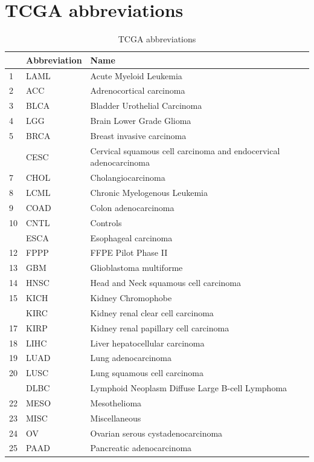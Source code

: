 \documentclass[
]{book}
\begin{document}
\section{TCGA abbreviations}\label{tcga-abbreviations}

\begin{table}

\caption{\label{tab:tb04-1}TCGA abbreviations}
\centering
\begin{tabular}[t]{lll}
\toprule
 & Abbreviation & Name\\
\midrule
1 & LAML & Acute Myeloid Leukemia\\
2 & ACC & Adrenocortical carcinoma\\
3 & BLCA & Bladder Urothelial Carcinoma\\
4 & LGG & Brain Lower Grade Glioma\\
5 & BRCA & Breast invasive carcinoma\\
\addlinespace
6 & CESC & Cervical squamous cell carcinoma and endocervical adenocarcinoma\\
7 & CHOL & Cholangiocarcinoma\\
8 & LCML & Chronic Myelogenous Leukemia\\
9 & COAD & Colon adenocarcinoma\\
10 & CNTL & Controls\\
\addlinespace
11 & ESCA & Esophageal carcinoma\\
12 & FPPP & FFPE Pilot Phase II\\
13 & GBM & Glioblastoma multiforme\\
14 & HNSC & Head and Neck squamous cell carcinoma\\
15 & KICH & Kidney Chromophobe\\
\addlinespace
16 & KIRC & Kidney renal clear cell carcinoma\\
17 & KIRP & Kidney renal papillary cell carcinoma\\
18 & LIHC & Liver hepatocellular carcinoma\\
19 & LUAD & Lung adenocarcinoma\\
20 & LUSC & Lung squamous cell carcinoma\\
\addlinespace
21 & DLBC & Lymphoid Neoplasm Diffuse Large B-cell Lymphoma\\
22 & MESO & Mesothelioma\\
23 & MISC & Miscellaneous\\
24 & OV & Ovarian serous cystadenocarcinoma\\
25 & PAAD & Pancreatic adenocarcinoma\\

\end{tabular}
\end{table}
\end{document}
